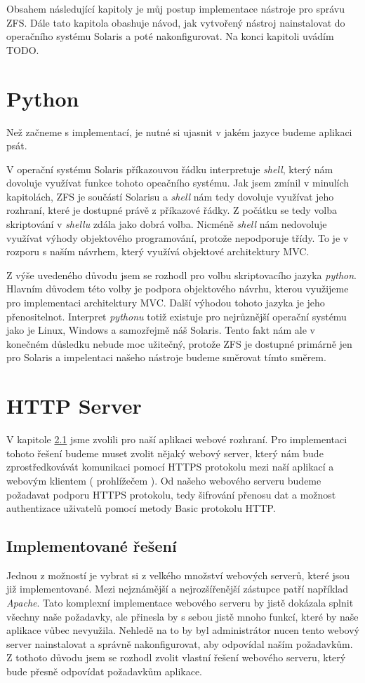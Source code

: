 Obsahem následující kapitoly je můj postup implementace nástroje pro správu ZFS. Dále tato kapitola obashuje návod, jak vytvořený nástroj nainstalovat do operačního systému Solaris a poté nakonfigurovat. Na konci kapitoli uvádím TODO.
\section{Python}
Než začneme s implementací, je nutné si ujasnit v jakém jazyce budeme aplikaci psát. 

V operační systému Solaris příkazouvou řádku interpretuje \emph{shell}, který nám dovoluje využívat funkce tohoto opeačního systému. Jak jsem zmínil v minulích kapitolách, ZFS je součástí Solarisu a \emph{shell} nám tedy dovoluje využívat jeho rozhraní, které je dostupné právě z příkazové řádky. Z počátku se tedy volba skriptování v \emph{shellu} zdála jako dobrá volba. Nicméně \emph{shell} nám nedovoluje využívat výhody objektového programování, protože nepodporuje třídy. To je v rozporu s naším návrhem, který využívá objektové architektury MVC.

Z výše uvedeného důvodu jsem se rozhodl pro volbu skriptovacího jazyka \emph{python}. Hlavním důvodem této volby je podpora objektového návrhu, kterou využijeme pro implementaci architektury MVC. Další výhodou tohoto jazyka je jeho přenositelnot. Interpret \emph{pythonu} totiž existuje pro nejrůznější operační systému jako je Linux, Windows a samozřejmě náš Solaris. Tento fakt nám ale v konečném důsledku nebude moc užitečný, protože ZFS je dostupné primárně jen pro Solaris a impelentaci našeho nástroje budeme směrovat tímto směrem.
\section{HTTP Server}
V kapitole \ref{} jsme zvolili pro naší aplikaci webové rozhraní. Pro implementaci tohoto řešení budeme muset zvolit nějaký webový server, který nám bude zprostředkovávát komunikaci pomocí HTTPS protokolu mezi naší aplikací a webovým klientem ( prohlížečem ). Od našeho webového serveru budeme požadavat podporu HTTPS protokolu, tedy šifrování přenosu dat a možnost authentizace uživatelů pomocí metody Basic protokolu HTTP.
    \subsection{Implementované řešení}
    Jednou z možností je vybrat si z velkého množství webových serverů, které jsou již implementované. Mezi nejznámější a nejrozšířenější zástupce patří například \emph{Apache}. Tato komplexní implementace webového serveru by jistě dokázala splnit všechny naše požadavky, ale přinesla by s sebou jistě mnoho funkcí, které by naše aplikace vůbec nevyužila. Nehledě na to by byl administrátor nucen tento webový server nainstalovat a správně nakonfigurovat, aby odpovídal naším požadavkům. Z tothoto důvodu jsem se rozhodl zvolit vlastní řešení webového serveru, který bude přesně odpovídat požadavkům aplikace.
